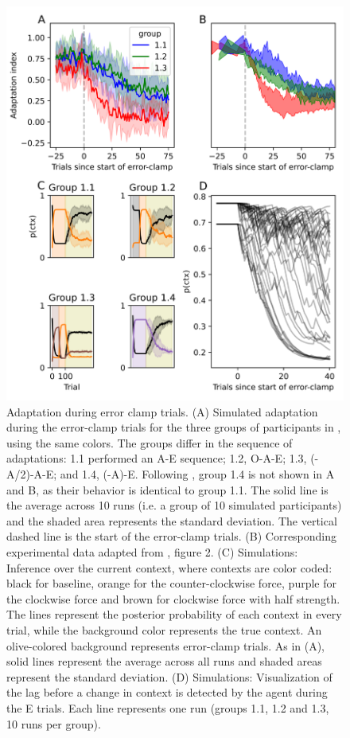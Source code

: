 \documentclass[a4paper,doc,floatsintext,natbib]{apa6}
\begin{document}
\begin{figure}
\centering
\includegraphics[width=\textwidth]{./figures/figure_5.png}
\caption{Adaptation during error clamp trials. (A) Simulated adaptation during the error-clamp trials for the three groups of participants in \cite{Vaswani_Decay_2013}, using the same colors. The groups differ in the sequence of adaptations: 1.1 performed an A-E sequence; 1.2, O-A-E; 1.3, (-A/2)-A-E; and 1.4, (-A)-E. Following \cite{Vaswani_Decay_2013}, group 1.4 is not shown in A and B, as their behavior is identical to group 1.1. The solid line is the average across 10 runs (i.e. a group of 10 simulated participants) and the shaded area represents the standard deviation. The vertical dashed line is the start of the error-clamp trials. (B) Corresponding experimental data adapted from \cite{Vaswani_Decay_2013}, figure 2. (C) Simulations: Inference over the current context, where contexts are color coded: black for baseline, orange for the counter-clockwise force, purple for the clockwise force and brown for clockwise force with half strength. The lines represent the posterior probability of each context in every trial, while the background color represents the true context. An olive-colored background represents error-clamp trials. As in (A), solid lines represent the average across all runs and shaded areas represent the standard deviation. (D) Simulations: Visualization of the lag before a change in context is detected by the agent during the E trials. Each line represents one run (groups 1.1, 1.2 and 1.3, 10 runs per group).}
\label{fig:vaswani-2013}
\end{figure}
\end{document}
